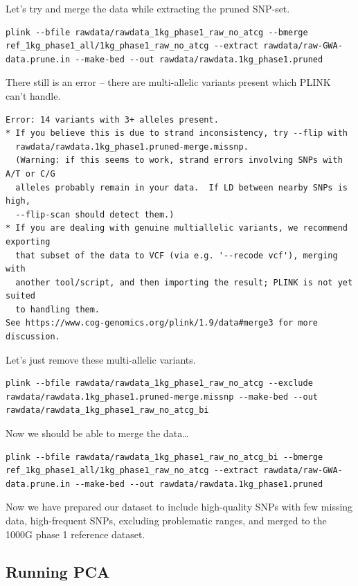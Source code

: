 \documentclass[
]{book}
\begin{document}
Let's try and merge the data while extracting the pruned SNP-set.

\begin{verbatim}
plink --bfile rawdata/rawdata_1kg_phase1_raw_no_atcg --bmerge ref_1kg_phase1_all/1kg_phase1_raw_no_atcg --extract rawdata/raw-GWA-data.prune.in --make-bed --out rawdata/rawdata.1kg_phase1.pruned
\end{verbatim}

There still is an error -- there are multi-allelic variants present which PLINK can't handle.

\begin{verbatim}
Error: 14 variants with 3+ alleles present.
* If you believe this is due to strand inconsistency, try --flip with
  rawdata/rawdata.1kg_phase1.pruned-merge.missnp.
  (Warning: if this seems to work, strand errors involving SNPs with A/T or C/G
  alleles probably remain in your data.  If LD between nearby SNPs is high,
  --flip-scan should detect them.)
* If you are dealing with genuine multiallelic variants, we recommend exporting
  that subset of the data to VCF (via e.g. '--recode vcf'), merging with
  another tool/script, and then importing the result; PLINK is not yet suited
  to handling them.
See https://www.cog-genomics.org/plink/1.9/data#merge3 for more discussion.
\end{verbatim}

Let's just remove these multi-allelic variants.

\begin{verbatim}
plink --bfile rawdata/rawdata_1kg_phase1_raw_no_atcg --exclude rawdata/rawdata.1kg_phase1.pruned-merge.missnp --make-bed --out rawdata/rawdata_1kg_phase1_raw_no_atcg_bi
\end{verbatim}

Now we should be able to merge the data\ldots{}

\begin{verbatim}
plink --bfile rawdata/rawdata_1kg_phase1_raw_no_atcg_bi --bmerge ref_1kg_phase1_all/1kg_phase1_raw_no_atcg --extract rawdata/raw-GWA-data.prune.in --make-bed --out rawdata/rawdata.1kg_phase1.pruned
\end{verbatim}

Now we have prepared our dataset to include high-quality SNPs with few missing data, high-frequent SNPs, excluding problematic ranges, and merged to the 1000G phase 1 reference dataset.

\hypertarget{running-pca}{%
\subsection{Running PCA}\label{running-pca}}
\end{document}
